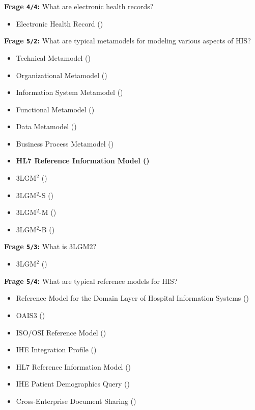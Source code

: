 \textbf{Frage \texttt{4/4}:} What are electronic health records?

\begin{itemize}
  \item Electronic Health Record ()
\end{itemize}

\textbf{Frage \texttt{5/2}:} What are typical metamodels for modeling various aspects of HIS?

\begin{itemize}
  \item Technical Metamodel ()
  \item Organizational Metamodel ()
  \item Information System Metamodel ()
  \item Functional Metamodel ()
  \item Data Metamodel ()
  \item Business Process Metamodel ()
  \item \textbf{ HL7 Reference Information Model ()}
  \item 3LGM$^{2}$ ()
  \item 3LGM$^{2}$-S ()
  \item 3LGM$^{2}$-M ()
  \item 3LGM$^{2}$-B ()
\end{itemize}

\textbf{Frage \texttt{5/3}:} What is 3LGM2?

\begin{itemize}
  \item 3LGM$^{2}$ ()
\end{itemize}

\textbf{Frage \texttt{5/4}:} What are typical reference models for HIS?

\begin{itemize}
  \item Reference Model for the Domain Layer of Hospital Information Systems ()
  \item OAIS3 ()
  \item ISO/OSI Reference Model ()
  \item IHE Integration Profile ()
  \item HL7 Reference Information Model ()
  \item IHE Patient Demographics Query ()
  \item Cross-Enterprise Document Sharing ()
\end{itemize}

